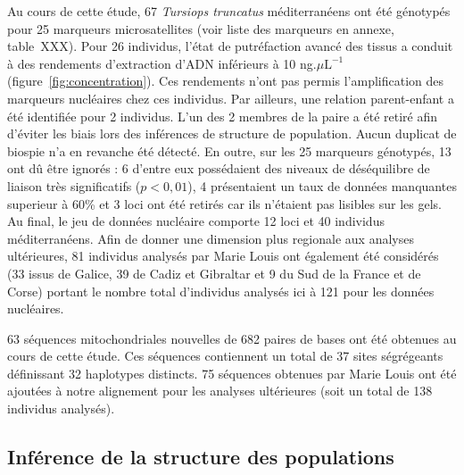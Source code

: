 \documentclass[a4paper,12pt,twoside]{article}\usepackage[]{graphicx}\usepackage[]{color}
\begin{document}
\begin {bibunit} [newbst]
Au cours de cette étude, 67 \emph{Tursiops truncatus} méditerranéens ont été génotypés pour 25 marqueurs microsatellites (voir liste des marqueurs en annexe, table~XXX). Pour 26 individus, l'état de putréfaction avancé des tissus a conduit à des rendements d'extraction d'ADN inférieurs à 10 ng$.\mu \textrm{L}^{-1}$ (figure~\ref{fig:concentration}). Ces rendements n'ont pas permis l'amplification des marqueurs nucléaires chez ces individus. Par ailleurs, une relation parent-enfant a été identifiée pour 2 individus. L'un des 2 membres de la paire a été retiré afin d'éviter les biais lors des inférences de structure de population. Aucun duplicat de biospie n'a en revanche été détecté.
En outre, sur les 25 marqueurs génotypés, 13 ont dû être ignorés : 6 d'entre eux possédaient des niveaux de déséquilibre de liaison très significatifs ($p<0,01$), 4 présentaient un taux de données manquantes superieur à 60\% et 3 loci ont été retirés car ils n'étaient pas lisibles sur les gels. Au final, le jeu de données nucléaire comporte 12 loci et 40 individus méditerranéens. Afin de donner une dimension plus regionale aux analyses ultérieures, 81 individus analysés par Marie Louis \citep{phdLouis2014} ont également été considérés (33 issus de Galice, 39 de Cadiz et Gibraltar et 9 du Sud de la France et de Corse) portant le nombre total d'individus analysés ici à 121 pour les données nucléaires.

63 séquences mitochondriales nouvelles de 682 paires de bases ont été obtenues au cours de cette étude. Ces séquences contiennent un total de 37 sites ségrégeants définissant 32 haplotypes distincts. 75 séquences obtenues par Marie Louis ont été ajoutées à notre alignement pour les analyses ultérieures (soit un total de 138 individus analysés).

\subsection{Inférence de la structure des populations}



\end{bibunit}
\end{document}
